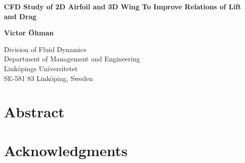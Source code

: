 \documentclass[11pt,a4paper,twoside]{article}
\begin{document}
\newlength{\figurewidth}\setlength{\figurewidth}{0.95\textwidth}
\begin{titlepage}
  \begin{center}


    \begin{LARGE}
      \bfseries
      CFD Study of 2D Airfoil and 3D Wing To Improve Relations of Lift and Drag\\
    \end{LARGE}

    \vspace{1cm}

    \begin{Large}
      \bfseries
       Victor Öhman\\[1ex]
    \end{Large}

    \vspace{1cm}
    \vspace{1.5cm}
    \begin{small}
      Division of Fluid Dynamics\\
			Department of Management and Engineering\\
      Linköpings Universitetet\\
      SE-581 83 Linköping, Sweden\\

    \end{small}
    \vspace{1cm}
     \vspace{0.5cm}
		 \begin{small}
      \bfseries
    \end{small}
	\end{center}
\end{titlepage}
\raggedbottom
\thispagestyle{empty}
\cleardoublepage



\chapter*{Abstract} %
\clearpage
\thispagestyle{empty}
\cleardoublepage
\thispagestyle{plain}


\chapter*{Acknowledgments}
\clearpage
\thispagestyle{empty}
\cleardoublepage
\thispagestyle{plain}
\end{document}
